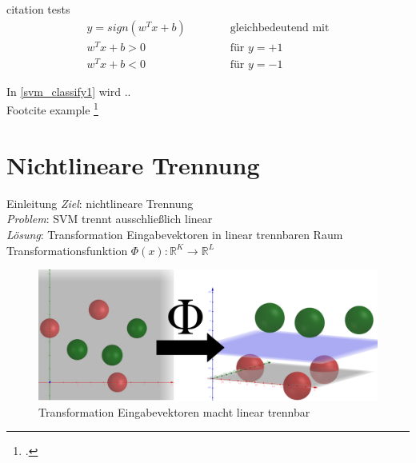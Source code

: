 \documentclass[ngerman]{beamer}
\begin{document}
\begin{frame}{citation tests}
	\begin{subequations} \label{svm_classify1}
		\begin{alignat}{2}
			y = sign(w^{T} x + b)  & \qquad & \text{ gleichbedeutend mit} \\
			w^{T} x + b > 0 & & \text{ für } y = +1\\
			w^{T} x + b < 0 & & \text{ für } y = -1
		\end{alignat}
	\end{subequations}

	In \cref{svm_classify1} wird .. \\
	
	Footcite example \footcite{platt_sequential_1998} \\
	
	\textcite{burges_tutorial_1998}
\end{frame}





\section{Nichtlineare Trennung}\label{sec:nichtlintrenn}
\begin{frame}{Einleitung}
    \emph{Ziel}: nichtlineare Trennung \\
    \emph{Problem}: SVM trennt ausschließlich linear \\ \pause
    \emph{Lösung}: Transformation Eingabevektoren in linear trennbaren Raum \\
    Transformationsfunktion $\Phi(x): \mathbb{R}^{K} \rightarrow \mathbb{R}^{L}$ \\
    \begin{center}
        \begin{figure}
            \includegraphics[width=\textwidth,height=0.7\textheight,keepaspectratio]{assets/2d_to_3d_phi}
            \caption{Transformation Eingabevektoren macht linear trennbar}
            \label{fig:transmachtlinear}
        \end{figure}
    \end{center}
\end{frame}
\end{document}
